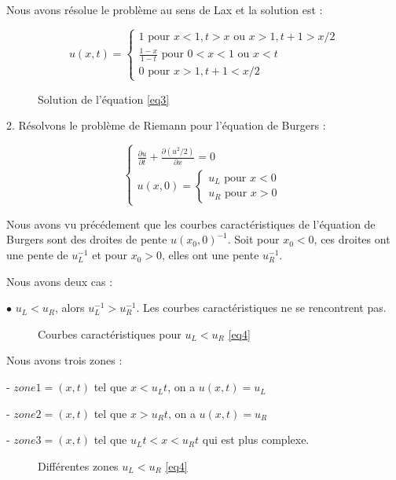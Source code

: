 \documentclass{article}
\begin{document}
Nous avons résolue le problème au sens de Lax et la solution est : 

\[u(x,t) = \left\{ \begin{matrix}
	1 \text{ pour } x<1, t>x \text{ ou } x>1, t+1>x/2 \\
	\frac{1-x}{1-t} \text{ pour } 0<x<1 \text{ ou } x<t \\
	0 \text{ pour } x>1, t+1<x/2
\end{matrix} \right.
\tag{Sol3}
\]

\begin{figure}[h]
  
  \caption{Solution de l'équation \ref{eq3}}
\end{figure}

2. Résolvons le problème de Riemann pour l'équation de Burgers :

\[ \left\{ \begin{matrix}
	\frac{\partial u}{\partial t} + \frac{\partial (u^2/2)}{\partial x} = 0 \\
	u(x,0) = \left\{ \begin{matrix}
					u_L \text{ pour } x<0 \\
					u_R \text{ pour } x>0
	\end{matrix} \right.
\end{matrix} \right.
\label{eq4} \tag{Burgers2}
\]

Nous avons vu précédement que les courbes caractéristiques de l'équation de Burgers sont des droites de pente $u(x_0,0)^{-1}$. Soit pour $x_0<0$, ces droites ont une pente de $u_L^{-1}$ et pour $x_0>0$, elles ont une pente $u_R^{-1}$.
\newline

Nous avons deux cas :

$\bullet$ $u_L < u_R$, alors $u_L^{-1} > u_R^{-1}$. Les courbes caractéristiques ne se rencontrent pas.

\begin{figure}[h]
  
  \caption{Courbes caractéristiques pour $u_L < u_R$ \ref{eq4}}
\end{figure}

Nous avons trois zones :

- $zone1 = (x,t)$ tel que $x < u_L t$, on a $u(x,t) = u_L$

- $zone2 = (x,t)$ tel que $x > u_R t$, on a $u(x,t) = u_R$

- $zone3 = (x,t)$ tel que $u_L t < x < u_R t$ qui est plus complexe.

\begin{figure}[h]
  
  \caption{Différentes zones $u_L < u_R$ \ref{eq4}}
\end{figure}
\end{document}
